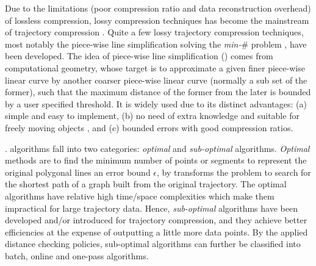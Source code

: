 Due to the  limitations (poor compression ratio and data reconstruction overhead) of lossless compression,  lossy compression techniques has become the mainstream of trajectory compression \cite{Lin:Operb,Zhang:Evaluation}. Quite a few lossy trajectory compression techniques, most notably the piece-wise line simplification \cite{Douglas:Peucker, Hershberger:Speeding, Keogh:online,Liu:BQS, Muckell:Compression, Chen:Trajectory, Chen:Fast, Cao:Spatio, Shi:Survey} solving the \emph{min-$\#$} problem \cite{Chan:Optimal, Imai:Optimal,Pavlidis:Segment}, have been developed. The idea of piece-wise line simplification (\lsa) comes from computational geometry, whose target is to approximate a given finer piece-wise linear curve by another coarser piece-wise linear curve ({normally} a sub set of the former), such that the maximum distance of the former from the later is bounded by a user specified threshold. It is widely used due to its distinct advantages: (a) simple and easy to implement, (b) no need of extra knowledge and suitable for freely  moving  objects \cite{Popa:Spatio}, and (c) bounded errors with good compression ratios.

%


. \lsa algorithms fall into two categories: \textit{optimal} and \textit{sub-optimal} algorithms.
\textit{Optimal} methods\cite{Imai:Optimal,Chan:Optimal} are to find the minimum number of points or segments to represent the original polygonal lines \wrt an error bound $\epsilon$, by transforms the problem to search for the shortest path of a graph built from the original trajectory.
The optimal \lsa algorithms have relative high time/space complexities which make them impractical for large trajectory data.
Hence, \textit{sub-optimal} \lsa algorithms have been developed and/or introduced for trajectory compression, and they achieve better efficiencies at the expense of outputting a little more data points. By the applied distance checking policies, sub-optimal algorithms can further be classified into
batch, online and one-pass algorithms.

